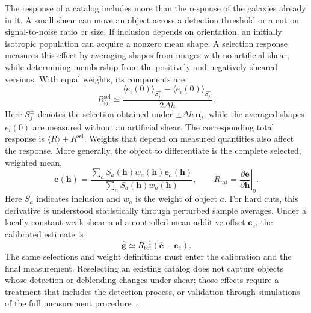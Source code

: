 The response of a catalog includes more than the response of the galaxies already in it. A small shear can move an object across a detection threshold or a cut on signal-to-noise ratio or size. If inclusion depends on orientation, an initially isotropic population can acquire a nonzero mean shape. A selection response measures this effect by averaging shapes from images with no artificial shear, while determining membership from the positively and negatively sheared versions. With equal weights, its components are~\cite{sheldon_practical_2017}
\begin{equation}
    R^{\mathrm{sel}}_{ij}\simeq
    \frac{\langle e_i(0)\rangle_{S_j^+}-\langle e_i(0)\rangle_{S_j^-}}{2\Delta h}.
    \label{eq:selection-response}
\end{equation}
Here $S_j^{\pm}$ denotes the selection obtained under $\pm\Delta h\,\boldsymbol{u}_j$, while the averaged shapes $e_i(0)$ are measured without an artificial shear. The corresponding total response is $\langle R\rangle+R^{\mathrm{sel}}$. Weights that depend on measured quantities also affect the response. More generally, the object to differentiate is the complete selected, weighted mean,
\begin{equation}
    \overline{\boldsymbol{e}}(\boldsymbol{h})=
    \frac{\sum_a S_a(\boldsymbol{h})w_a(\boldsymbol{h})\boldsymbol{e}_a(\boldsymbol{h})}
    {\sum_a S_a(\boldsymbol{h})w_a(\boldsymbol{h})},
    \qquad
    R_{\mathrm{tot}}=\left.\frac{\partial\overline{\boldsymbol{e}}}{\partial\boldsymbol{h}}\right|_0.
    \label{eq:weighted-response}
\end{equation}
Here $S_a$ indicates inclusion and $w_a$ is the weight of object $a$. For hard cuts, this derivative is understood statistically through perturbed sample averages. Under a locally constant weak shear and a controlled mean additive offset $\boldsymbol{c}_e$, the calibrated estimate is
\begin{equation}
    \widehat{\boldsymbol{g}}\simeq
    R_{\mathrm{tot}}^{-1}(\overline{\boldsymbol{e}}-\boldsymbol{c}_e).
    \label{eq:calibrated-shear}
\end{equation}
The same selections and weight definitions must enter the calibration and the final measurement. Reselecting an existing catalog does not capture objects whose detection or deblending changes under shear; those effects require a treatment that includes the detection process, or validation through simulations of the full measurement procedure~\cite{sheldon_practical_2017}.

